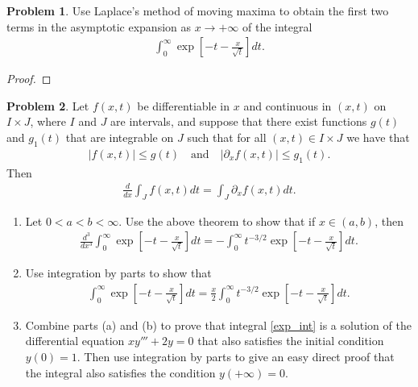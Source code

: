 \documentclass[12pt]{article}
\theoremstyle{definition}
\newtheorem{problem}{Problem}
\begin{document}
\begin{problem}
  Use Laplace's method of moving maxima to obtain the first two terms in the asymptotic
  expansion as $x \to +\infty$ of the integral
  \begin{align}\label{exp_int}
    \int_{0}^\infty \exp\left[-t - \frac{x}{\sqrt{t}}\right] dt.
  \end{align}
\end{problem}

\begin{proof}
\end{proof}
\newpage


\begin{problem}
  Let $f(x, t)$ be differentiable in $x$ and continuous in $(x, t)$ on $I \times J$,
  where $I$ and $J$ are intervals, and suppose that there exist functions $g(t)$ and $g_1(t)$
  that are integrable on $J$ such that for all $(x,t) \in I \times J$ we have that
  \begin{align*}
    |f(x,t)|\leq g(t) \quad \text{and} \quad |\partial_x f(x,t)| \leq g_1(t).
  \end{align*}
  Then
  \begin{align*}
    \frac{d}{dx} \int_J f(x,t) dt = \int_J \partial_x f(x,t) dt.
  \end{align*}
  \begin{enumerate}
    \item Let $0 < a < b < \infty$. Use the above theorem to show that if $x \in (a,b)$, then
      \begin{align*}
        \frac{d^3}{dx^3} \int_0^\infty \exp\left[-t - \frac{x}{\sqrt{t}}\right] dt = -\int_0^\infty t^{-3/2}\exp\left[-t - \frac{x}{\sqrt{t}}\right] dt.
      \end{align*}
    \item Use integration by parts to show that
      \begin{align*}
        \int_0^\infty \exp\left[-t - \frac{x}{\sqrt{t}}\right] dt = \frac{x}{2}\int_0^\infty t^{-3/2}\exp\left[-t - \frac{x}{\sqrt{t}}\right] dt.
      \end{align*}
    \item Combine parts (a) and (b) to prove that integral \eqref{exp_int} is a solution of the
      differential equation $xy''' + 2y = 0$ that also satisfies the initial condition $y(0) = 1$.
      Then use integration by parts to give an easy direct proof that the integral also satisfies
      the condition $y(+\infty) = 0$.
  \end{enumerate}
\end{problem}
\end{document}
